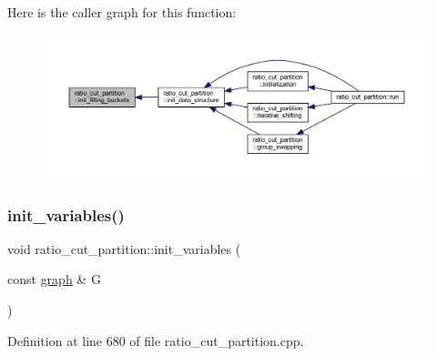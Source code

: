 Here is the caller graph for this function\+:\nopagebreak
\begin{figure}[H]
\begin{center}
\leavevmode
\includegraphics[width=350pt]{classratio__cut__partition_a19fc538dbdaf8b1e0810a5bcde348c38_icgraph}
\end{center}
\end{figure}
\mbox{\label{classratio__cut__partition_ab3054dcfbcd012aba57218fa6d0c471b}} 
\subsubsection{\texorpdfstring{init\+\_\+variables()}{init\_variables()}}
{\footnotesize\ttfamily void ratio\+\_\+cut\+\_\+partition\+::init\+\_\+variables (\begin{DoxyParamCaption}\item[{const \mbox{\hyperlink{classgraph}{graph}} \&}]{G }\end{DoxyParamCaption})\hspace{0.3cm}{\ttfamily [protected]}}



Definition at line 680 of file ratio\+\_\+cut\+\_\+partition.\+cpp.


